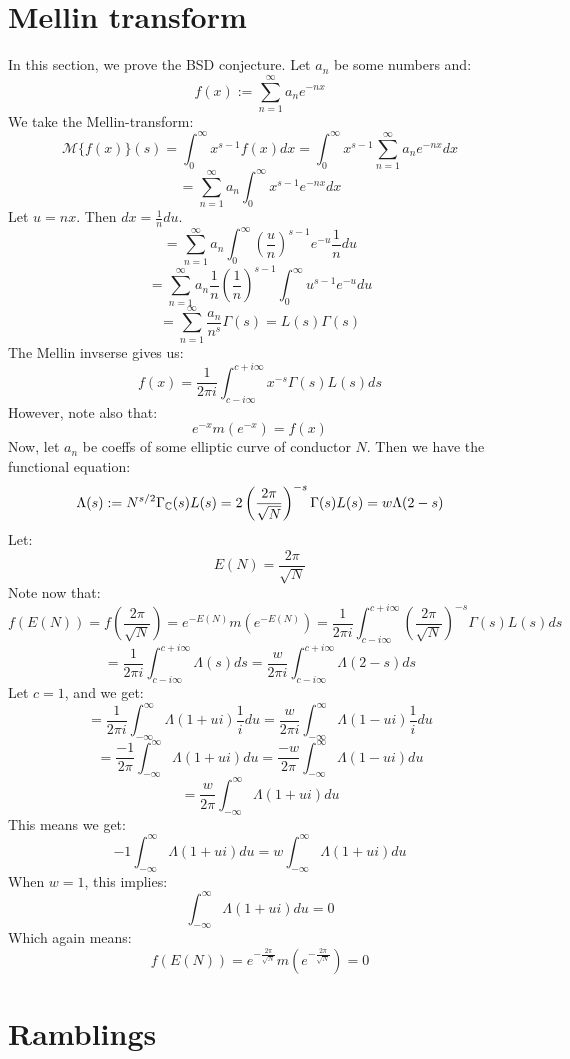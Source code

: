 \documentclass[a4paper]{amsart}
\begin{document}
\section{Mellin transform}
In this section, we prove the BSD conjecture. Let $a_n$ be some numbers and:
$$f(x) := \sum_{n = 1}^\infty a_n e^{-nx}$$
We take the Mellin-transform: 
$$\mathcal{M}\{f(x)\}(s) = \int_0^\infty x^{s - 1} f(x) dx = \int_0^\infty x^{s - 1} \sum_{n = 1}^\infty a_n e^{-nx} dx$$
$$ = \sum_{n = 1}^\infty a_n \int_0^\infty x^{s - 1} e^{-nx} dx$$
Let $u = nx$. Then $dx = \frac{1}{n} du$.
$$ = \sum_{n = 1}^\infty a_n \int_0^\infty \left(\frac{u}{n}\right)^{s - 1} e^{-u} \frac{1}{n} du$$
$$ = \sum_{n = 1}^\infty a_n \frac{1}{n} \left(\frac{1}{n}\right)^{s - 1} \int_0^\infty u^{s - 1} e^{-u} du$$
$$ = \sum_{n = 1}^\infty \frac{a_n}{n^s} \Gamma(s) = L(s) \Gamma(s)$$
The Mellin invserse gives us: 
$$f(x) = \frac{1}{2\pi i}\int_{c - i \infty}^{c + i \infty} x^{-s} \Gamma(s) L(s)ds$$
However, note also that:
$$e^{-x}m(e^{-x}) = f(x)$$
Now, let $a_n$ be coeffs of some elliptic curve of conductor $N$. Then we have the functional equation:
$$\Lambda(s) := N^{s/2} \Gamma_{\mathbb{C}}(s) L(s) = 2 \left(\frac{2\pi}{\sqrt{N}}\right)^{-s} \Gamma(s) L(s) = w\Lambda(2 - s)$$
Let:
$$E(N) = \frac{2\pi}{\sqrt{N}}$$
Note now that:
$$ f(E(N)) = f\left(\frac{2\pi}{\sqrt{N}}\right) = e^{-E(N)} m\left(e^{-E(N)}\right) = \frac{1}{2\pi i} \int_{c - i \infty}^{c + i \infty} \left(\frac{2\pi}{\sqrt{N}}\right)^{-s} \Gamma(s) L(s)ds$$
$$ = \frac{1}{2\pi i} \int_{c - i \infty}^{c + i \infty} \Lambda(s) ds = \frac{w}{2\pi i}\int_{c - i \infty}^{c + i \infty} \Lambda(2 - s) ds$$
Let $c = 1$,  and we get:
$$ = \frac{1}{2\pi i} \int_{-\infty}^{\infty} \Lambda(1 + ui) \frac{1}{i}du = \frac{w}{2\pi i}\int_{-\infty}^{\infty} \Lambda(1 - ui) \frac{1}{i}du$$
$$ = \frac{-1}{2\pi} \int_{-\infty}^{\infty} \Lambda(1 + ui) du = \frac{-w}{2\pi}\int_{-\infty}^{\infty} \Lambda(1 - ui) du$$
$$ = \frac{w}{2\pi}\int_{-\infty}^{\infty} \Lambda(1 + ui) du$$
This means we get:
$$-1 \int_{-\infty}^{\infty} \Lambda(1 + ui) du = w\int_{-\infty}^{\infty} \Lambda(1 + ui) du$$
When $w = 1$, this implies:
$$\int_{-\infty}^{\infty} \Lambda(1 + ui) du = 0$$
Which again means: 
$$f(E(N)) = e^{-\frac{2\pi}{\sqrt{N}}} m\left(e^{-\frac{2\pi}{\sqrt{N}}}\right) = 0$$


\section{Ramblings}
\end{document}
